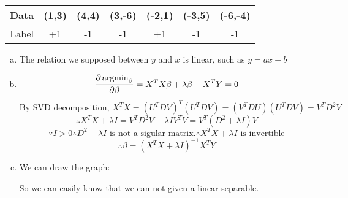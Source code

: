 \documentclass[10pt]{article}
\begin{document}
\begin{enumerate}[1.]
\begin{itemize}
		\begin{table}[h]
			\centering
			\begin{tabular}{c|cccccc}
				Data & (1,3) & (4,4) & (3,-6) & (-2,1) & (-3,5) & (-6,-4) \\ \hline
				Label & +1 & -1 & -1 & +1 & -1 & -1
			\end{tabular}
			\label{tab:my_label}
		\end{table}
		\end{itemize}
		
		\begin{enumerate}[(a)]
			\item 
			The relation we supposed between $y$ and $x$ is linear, such as $y=ax+b$
			\item 
			$$\frac{\partial \mathop{\rm argmin}_\beta}{\partial \beta}=X^TX\beta+\lambda\beta-X^TY=0$$
			$$\text{By SVD decomposition, }X^TX=(U^TDV)^T(U^TDV)=(V^TDU)(U^TDV)=V^TD^2V$$
			$$\therefore X^TX+\lambda I=V^TD^2V+\lambda IV^TV=V^T(D^2+\lambda I)V$$
			$$\because I>0\therefore D^2+\lambda I\mbox{ is not a sigular matrix.}\therefore X^TX+\lambda I\mbox{ is invertible}$$
			$$\therefore\beta=(X^TX+\lambda I)^{-1}X^TY$$
			\item 
			We can draw the graph:


				So we can easily know that we can not given a linear separable.
		\end{enumerate}

		\newpage


\end{enumerate}
\end{document}
